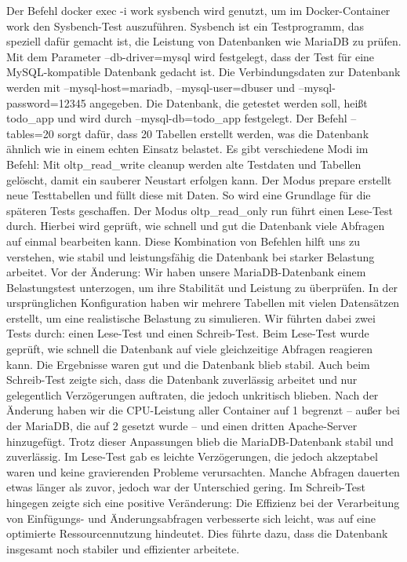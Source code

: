 Der Befehl docker exec -i work sysbench wird genutzt, um im Docker-Container work den Sysbench-Test auszuführen. Sysbench ist ein Testprogramm, das speziell dafür gemacht ist, die Leistung von Datenbanken wie MariaDB zu prüfen. Mit dem Parameter --db-driver=mysql wird festgelegt, dass der Test für eine MySQL-kompatible Datenbank gedacht ist. Die Verbindungsdaten zur Datenbank werden mit --mysql-host=mariadb, --mysql-user=dbuser und --mysql-password=12345 angegeben. Die Datenbank, die getestet werden soll, heißt todo\_app und wird durch --mysql-db=todo\_app festgelegt. Der Befehl --tables=20 sorgt dafür, dass 20 Tabellen erstellt werden, was die Datenbank ähnlich wie in einem echten Einsatz belastet. Es gibt verschiedene Modi im Befehl: Mit oltp\_read\_write cleanup werden alte Testdaten und Tabellen gelöscht, damit ein sauberer Neustart erfolgen kann. Der Modus prepare erstellt neue Testtabellen und füllt diese mit Daten. So wird eine Grundlage für die späteren Tests geschaffen. Der Modus oltp\_read\_only run führt einen Lese-Test durch. Hierbei wird geprüft, wie schnell und gut die Datenbank viele Abfragen auf einmal bearbeiten kann. Diese Kombination von Befehlen hilft uns zu verstehen, wie stabil und leistungsfähig die Datenbank bei starker Belastung arbeitet.
Vor der Änderung: Wir haben unsere MariaDB-Datenbank einem Belastungstest unterzogen, um ihre Stabilität und Leistung zu überprüfen. In der ursprünglichen Konfiguration haben wir mehrere Tabellen mit vielen Datensätzen erstellt, um eine realistische Belastung zu simulieren. Wir führten dabei zwei Tests durch: einen Lese-Test und einen Schreib-Test. Beim Lese-Test wurde geprüft, wie schnell die Datenbank auf viele gleichzeitige Abfragen reagieren kann. Die Ergebnisse waren gut und die Datenbank blieb stabil. Auch beim Schreib-Test zeigte sich, dass die Datenbank zuverlässig arbeitet und nur gelegentlich Verzögerungen auftraten, die jedoch unkritisch blieben.
Nach der Änderung haben wir die CPU-Leistung aller Container auf 1 begrenzt – außer bei der MariaDB, die auf 2 gesetzt wurde – und einen dritten Apache-Server hinzugefügt. Trotz dieser Anpassungen blieb die MariaDB-Datenbank stabil und zuverlässig. Im Lese-Test gab es leichte Verzögerungen, die jedoch akzeptabel waren und keine gravierenden Probleme verursachten. Manche Abfragen dauerten etwas länger als zuvor, jedoch war der Unterschied gering. Im Schreib-Test hingegen zeigte sich eine positive Veränderung: Die Effizienz bei der Verarbeitung von Einfügungs- und Änderungsabfragen verbesserte sich leicht, was auf eine optimierte Ressourcennutzung hindeutet. Dies führte dazu, dass die Datenbank insgesamt noch stabiler und effizienter arbeitete.

